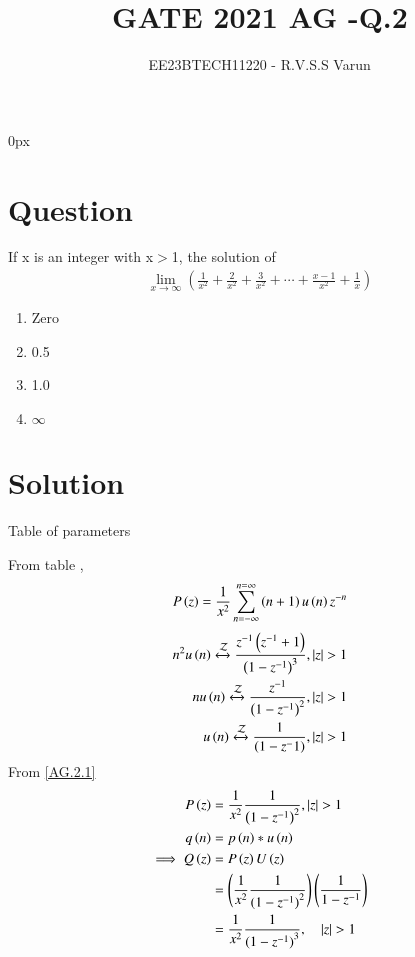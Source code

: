 \documentclass[beamer]{IEEEtran}
\theoremstyle{remark}
\begin{document}
\parindent 0px


\title{GATE 2021 AG -Q.2}
\author{EE23BTECH11220 - R.V.S.S Varun$^{}$%
}
\maketitle
\newpage
\bigskip

\renewcommand{\thefigure}{\theenumi}
\renewcommand{\thetable}{\theenumi}
\section*{Question}
If x is an integer with  x$>$1, the solution of 
\begin{align*}
\lim_{x\to\infty}\left(\frac{1}{x^2}+\frac{2}{x^2}+\frac{3}{x^2}+\cdots+\frac{x-1}{x^2}+\frac{1}{x}\right)
\end{align*}
\begin{enumerate}[label=\alph*)]
\item Zero 
\item 0.5 
\item 1.0 
\item $\infty$  \hfill{}
\end{enumerate}
\section*{Solution}

\begin{table}[h]
    \centering
   
 \caption{Table of parameters}
    \label{tab:AG.2.1}
\end{table}

From table ,
\begin{align}
	P\left(z\right)=\frac{1}{x^2}\sum_{n=-\infty}^{n=\infty}\left(n+1\right)u\left(n\right)z^{-n} \label{AG.2.1}
\end{align}
\begin{align}
	n^2 u\left(n\right)\xleftrightarrow{\mathcal{Z}} \frac{z^{-1}\left(z^{-1}+1\right)}{\left(1-z^{-1}\right)^3} ,  \left\vert z\right\vert > 1 \label{ag.2.1}\\
	n u\left(n\right)\xleftrightarrow{\mathcal{Z}} \frac{z^{-1}}{\left(1-z^{-1}\right)^2} ,   \left\vert z\right\vert >1 \label{ag.2.2}\\
   u\left(n\right)\xleftrightarrow{\mathcal{Z}} \frac{1}{\left(1-z^-1\right)} ,   \left\vert z\right\vert >1  \label{ag.2.3}
\end{align}
From \eqref{AG.2.1}
\begin{align}
	P\left(z\right)&=\frac{1}{x^2}\frac{1}{\left(1-z^{-1}\right)^2} , \left\vert z\right\vert >1\\
	q\left(n\right)&=p\left(n\right)\ast u\left(n\right)\\
	\implies Q\left(z\right)&=P\left(z\right)U\left(z\right)   \\
	&=\left(\frac{1}{x^2}\frac{1}{({1-z^{-1})}^{2}}\right)\left(\frac{1}{1-z^{-1}}\right)  \\
	 &=\frac{1}{x^2}\frac{1}{({1-z^{-1})}^{3}} ,\quad \left\vert z\right\vert>1
\end{align}
\end{document}
